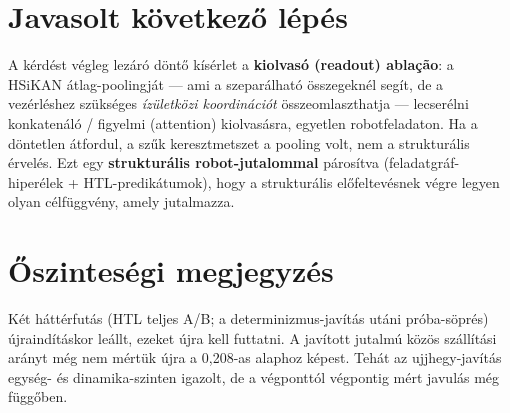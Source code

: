 \documentclass[11pt,a4paper]{article}
\begin{document}
\section{Javasolt következő lépés}

A kérdést végleg lezáró döntő kísérlet a \textbf{kiolvasó (readout) ablação}: a HSiKAN átlag-poolingját
--- ami a szeparálható összegeknél segít, de a vezérléshez szükséges \emph{ízületközi koordinációt}
összeomlaszthatja --- lecserélni konkatenáló / figyelmi (attention) kiolvasásra, egyetlen robotfeladaton.
Ha a döntetlen átfordul, a szűk keresztmetszet a pooling volt, nem a strukturális érvelés. Ezt egy
\textbf{strukturális robot-jutalommal} párosítva (feladatgráf-hiperélek + HTL-prediká\-tumok), hogy a
strukturális előfeltevésnek végre legyen olyan célfüggvény, amely jutalmazza.

\section*{Őszinteségi megjegyzés}

Két háttérfutás (HTL teljes A/B; a determinizmus-javítás utáni próba-söprés) újraindításkor leállt,
ezeket újra kell futtatni. A javított jutalmú közös szállítási arányt még nem mértük újra a 0,208-as
alaphoz képest. Tehát az ujjhegy-javítás egység- és dinamika-szinten igazolt, de a végponttól végpontig
mért javulás még függőben.
\end{document}
